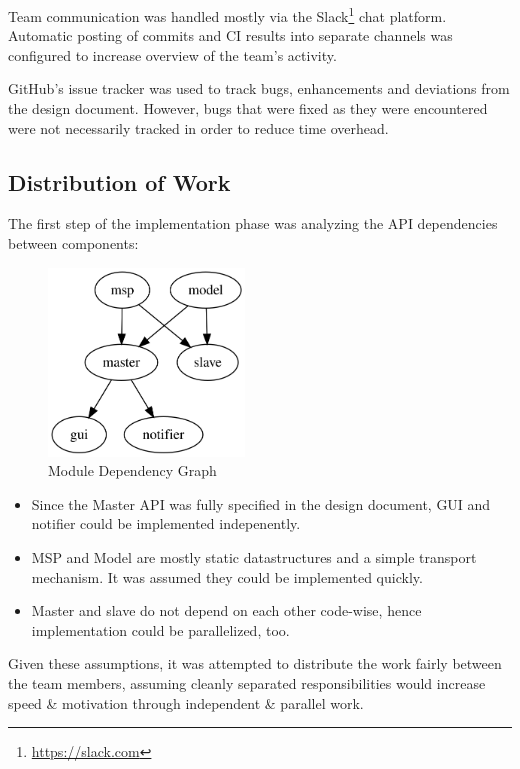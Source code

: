 Team communication was handled mostly via the Slack\footnote{\url{https://slack.com}} chat platform.
Automatic posting of commits and CI results into separate channels was configured to increase overview of the team's activity.

GitHub's issue tracker was used to track bugs, enhancements and deviations from the design document.
However, bugs that were fixed as they were encountered were not necessarily tracked in order to reduce time overhead.

\subsection{Distribution of Work}

The first step of the implementation phase was analyzing the API dependencies between \mamid components:

\begin{figure}[h]
\centering
\includegraphics[height=5cm]{assets/module_graph}
\caption{Module Dependency Graph}
\end{figure}

\begin{itemize}
  \item Since the Master API was fully specified in the design document, GUI and notifier could be implemented indepenently.

  \item MSP and Model are mostly static datastructures and a simple transport mechanism.
        It was assumed they could be implemented quickly.

  \item Master and slave do not depend on each other code-wise, hence implementation could be parallelized, too.
\end{itemize}

Given these assumptions, it was attempted to distribute the work fairly between the team members, assuming cleanly separated
responsibilities would increase speed \& motivation through independent \& parallel work.

